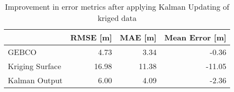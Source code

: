 \begin{table}
\centering
\caption{Improvement in error metrics after applying Kalman Updating of kriged data}
\label{tab:oahu8_gebco_raster_error}
\begin{tabular}{lrrr}
\toprule
 & RMSE [m] & MAE [m] & Mean Error [m] \\
\midrule
GEBCO & 4.73 & 3.34 & -0.36 \\
Kriging Surface & 16.98 & 11.38 & -11.05 \\
Kalman Output & 6.00 & 4.09 & -2.36 \\
\bottomrule
\end{tabular}
\end{table}
